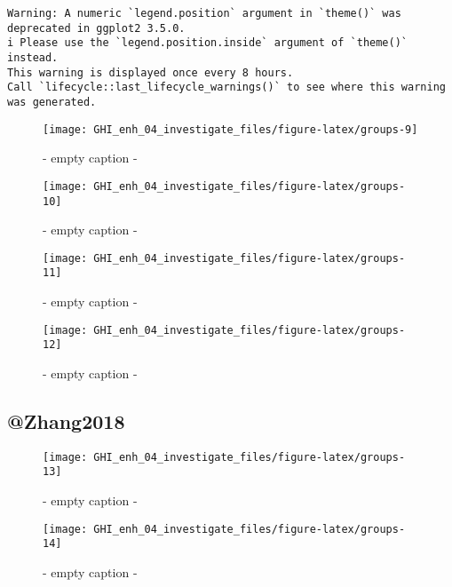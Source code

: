 \documentclass[
  10pt,
  a4paper,oneside]{article}
\begin{document}
\begin{verbatim}
Warning: A numeric `legend.position` argument in `theme()` was deprecated in ggplot2 3.5.0.
i Please use the `legend.position.inside` argument of `theme()` instead.
This warning is displayed once every 8 hours.
Call `lifecycle::last_lifecycle_warnings()` to see where this warning was generated.
\end{verbatim}

\begin{figure}[H]

{\centering \texttt{[image: GHI\_enh\_04\_investigate\_files/figure-latex/groups-9]} 

}

\caption{ - empty caption - }\label{fig:groups-9}
\end{figure}
\begin{figure}[H]

{\centering \texttt{[image: GHI\_enh\_04\_investigate\_files/figure-latex/groups-10]} 

}

\caption{ - empty caption - }\label{fig:groups-10}
\end{figure}
\begin{figure}[H]

{\centering \texttt{[image: GHI\_enh\_04\_investigate\_files/figure-latex/groups-11]} 

}

\caption{ - empty caption - }\label{fig:groups-11}
\end{figure}
\begin{figure}[H]

{\centering \texttt{[image: GHI\_enh\_04\_investigate\_files/figure-latex/groups-12]} 

}

\caption{ - empty caption - }\label{fig:groups-12}
\end{figure}

\hypertarget{zhang2018}{%
\subsection{@Zhang2018}\label{zhang2018}}

\begin{figure}[H]

{\centering \texttt{[image: GHI\_enh\_04\_investigate\_files/figure-latex/groups-13]} 

}

\caption{ - empty caption - }\label{fig:groups-13}
\end{figure}
\begin{figure}[H]

{\centering \texttt{[image: GHI\_enh\_04\_investigate\_files/figure-latex/groups-14]} 

}

\caption{ - empty caption - }\label{fig:groups-14}
\end{figure}
\end{document}
